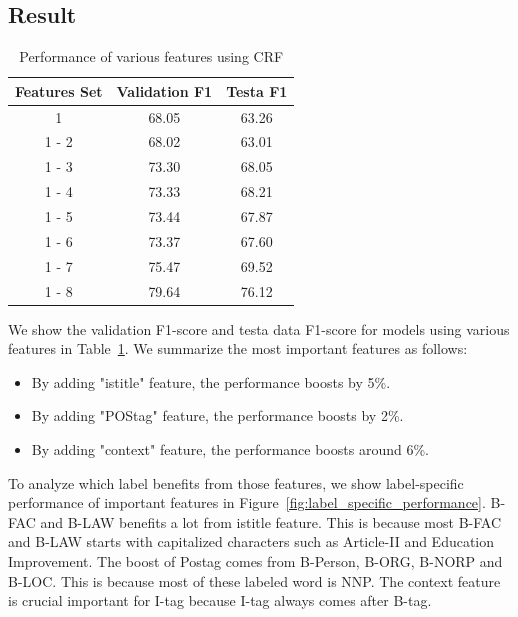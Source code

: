 \documentclass[a4paper]{article}
\begin{document}
\begin{spacing}{1.5}
  \subsection{Result}
  \begin{table}
    \centering
    \caption{Performance of various features using CRF}
    \begin{tabular}{|c|c|c|}
      \hline
      Features Set & Validation F1 & Testa F1 \\\hline
      1   & 68.05 & 63.26 \\\hline
      1 - 2 & 68.02 &  63.01\\\hline
      1 - 3 & 73.30 & 68.05 \\\hline
      1 - 4 & 73.33 &  68.21 \\\hline
      1 - 5 & 73.44 &  67.87 \\\hline
      1 - 6 & 73.37 & 67.60 \\\hline
      1 - 7 & 75.47 & 69.52 \\\hline
      1 - 8 & 79.64 & 76.12  \\\hline
    \end{tabular}
  \label{table:crf_performance}
  \end{table}
  
  We show the validation F1-score and testa data F1-score for models using various features in Table~\ref{table:crf_performance}. We summarize the most important features as follows:
  \begin{itemize}
    \item By adding "istitle" feature, the performance boosts by 5\%.
    \item By adding "POStag" feature, the performance boosts by 2\%.
    \item By adding "context" feature, the performance boosts around 6\%.
  \end{itemize}
   To analyze which label benefits from those features, we show label-specific performance of important features in Figure~\ref{fig:label_specific_performance}.
   B-FAC and B-LAW benefits a lot from istitle feature. This is because most B-FAC and B-LAW starts with capitalized characters such as Article-II and Education Improvement. The boost of Postag comes from B-Person, B-ORG, B-NORP and B-LOC. This is because most of these labeled word is NNP. The context feature is crucial important for I-tag because I-tag always comes after B-tag.
  

\end{spacing}
\end{document}
